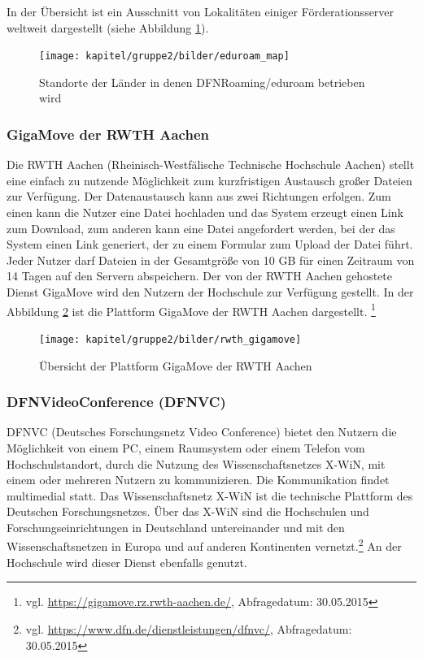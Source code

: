 In der Übersicht ist ein Ausschnitt von Lokalitäten einiger Förderationsserver weltweit dargestellt (siehe Abbildung \ref{fig_map_eduroam}).

\begin{figure}[h!]
	\centering
	\texttt{[image: kapitel/gruppe2/bilder/eduroam\_map]}
	\caption{Standorte der Länder in denen DFNRoaming/eduroam betrieben wird \protect\footnotemark}
	\label{fig_map_eduroam}
\end{figure}

\subsubsection{GigaMove der RWTH Aachen}
Die RWTH Aachen (Rheinisch-Westfälische Technische Hochschule Aachen) stellt eine einfach zu nutzende Möglichkeit zum kurzfristigen Austausch großer Dateien zur Verfügung. Der Datenaustausch kann aus zwei Richtungen erfolgen. Zum einen kann die Nutzer eine Datei hochladen und das System erzeugt einen Link zum Download, zum anderen kann eine Datei angefordert werden, bei der das System einen Link generiert, der zu einem Formular zum Upload der Datei führt. Jeder Nutzer darf Dateien in der Gesamtgröße von 10 GB für einen Zeitraum von 14 Tagen auf den Servern abspeichern. Der von der RWTH Aachen gehostete Dienst GigaMove wird den Nutzern der Hochschule zur Verfügung gestellt. In der Abbildung \ref{fig_rwth_gigamove} ist die Plattform GigaMove der RWTH Aachen dargestellt. \footnote{vgl. \url{https://gigamove.rz.rwth-aachen.de/}, Abfragedatum: 30.05.2015}

\begin{figure}
	\centering
	\texttt{[image: kapitel/gruppe2/bilder/rwth\_gigamove]}
	\caption{Übersicht der Plattform GigaMove der RWTH Aachen \protect\footnotemark}
	\label{fig_rwth_gigamove}
\end{figure}

\subsubsection{DFNVideoConference (DFNVC)}
DFNVC (Deutsches Forschungsnetz Video Conference) bietet den Nutzern die Möglichkeit von einem PC, einem Raumsystem oder einem Telefon vom Hochschulstandort, durch die Nutzung des Wissenschaftsnetzes X-WiN, mit einem oder mehreren Nutzern zu kommunizieren. Die Kommunikation findet multimedial statt. Das Wissenschaftsnetz X-WiN ist die technische Plattform des Deutschen Forschungsnetzes. Über das X-WiN sind die Hochschulen und Forschungseinrichtungen in Deutschland untereinander und mit den Wissenschaftsnetzen in Europa und auf anderen Kontinenten vernetzt.\footnote{vgl. \url{https://www.dfn.de/dienstleistungen/dfnvc/}, Abfragedatum: 30.05.2015} An der Hochschule wird dieser Dienst ebenfalls genutzt.

